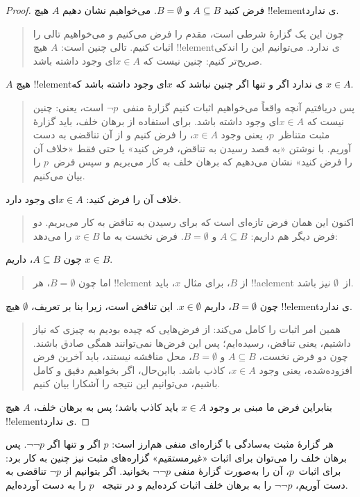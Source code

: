 \documentclass[../../../include/open-logic-section]{subfiles}
\begin{document}
\begin{proof}
  فرض کنید $A \subseteq B$ و $B = \emptyset$. می‌خواهیم نشان دهیم
  $A$ هیچ !!{element}ی ندارد.
  \begin{quote}
    چون این یک گزارهٔ شرطی است، مقدم را فرض می‌کنیم و می‌خواهیم تالی
    را اثبات کنیم. تالی چنین است: $A$ هیچ !!{element}ی ندارد. می‌توانیم
    این را اندکی صریح‌تر کنیم: چنین نیست که $x \in A$ای وجود داشته باشد.
  \end{quote}
  $A$ هیچ !!{element}ی ندارد اگر و تنها اگر چنین نباشد که $x$ای وجود
  داشته باشد که $x \in A$.
  \begin{quote}
    پس دریافتیم آنچه واقعاً می‌خواهیم اثبات کنیم گزارهٔ منفی~$\lnot p$
    است، یعنی: چنین نیست که $x \in A$ای وجود داشته باشد. برای استفاده
    از برهان خلف، باید گزارهٔ مثبت متناظر~$p$، یعنی وجود $x \in A$، را
    فرض کنیم و از آن تناقضی به دست آوریم. با نوشتن «به قصد رسیدن به
    تناقض، فرض کنید» یا حتی فقط «خلاف آن را فرض کنید» نشان می‌دهیم که
    برهان خلف به کار می‌بریم و سپس فرض~$p$ را بیان می‌کنیم.
  \end{quote}
  خلاف آن را فرض کنید: $x \in A$ای وجود دارد.
  \begin{quote}
    اکنون این همان فرض تازه‌ای است که برای رسیدن به تناقض به کار
    می‌بریم. دو فرض دیگر هم داریم: $A \subseteq B$ و
    $B = \emptyset$. فرض نخست به ما $x \in B$ را می‌دهد:
  \end{quote}
  چون $A \subseteq B$، داریم $x \in B$.
  \begin{quote}
    اما چون $B = \emptyset$، هر !!{element} از $B$، برای مثال $x$،
    باید !!a{element} از~$\emptyset$ نیز باشد.
  \end{quote}
  چون $B = \emptyset$، داریم $x \in \emptyset$. این تناقض است، زیرا
  بنا بر تعریف، $\emptyset$ هیچ !!{element}ی ندارد.
  \begin{quote}
    همین امر اثبات را کامل می‌کند: از فرض‌هایی که چیده بودیم به چیزی
    که نیاز داشتیم، یعنی تناقض، رسیده‌ایم؛ پس این فرض‌ها نمی‌توانند
    همگی صادق باشند. چون دو فرض نخست، $A \subseteq B$ و
    $B = \emptyset$، محل مناقشه نیستند، باید آخرین فرض افزوده‌شده، یعنی
    وجود $x \in A$، کاذب باشد. بااین‌حال، اگر بخواهیم دقیق و کامل
    باشیم، می‌توانیم این نتیجه را آشکارا بیان کنیم.
  \end{quote}
  بنابراین فرض ما مبنی بر وجود $x \in A$ باید کاذب باشد؛ پس به برهان
  خلف، $A$ هیچ !!{element}ی ندارد.
\end{proof}

هر گزارهٔ مثبت به‌سادگی با گزاره‌ای منفی هم‌ارز است: $p$ اگر و تنها
اگر $\lnot\lnot p$. پس برهان خلف را می‌توان برای اثبات «غیرمستقیم»
گزاره‌های مثبت نیز چنین به کار برد: برای اثبات~$p$، آن را به‌صورت
گزارهٔ منفی $\lnot\lnot p$ بخوانید. اگر بتوانیم از $\lnot p$ تناقضی
به دست آوریم، $\lnot\lnot p$ را به برهان خلف اثبات کرده‌ایم و در نتیجه
~$p$ را به دست آورده‌ایم.
\end{document}

